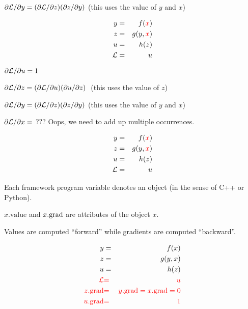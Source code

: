 {\medskip
{\color{red} ${\partial {\cal L}}/{\partial y} = ({\partial {\cal L}}/{\partial z}) ({\partial z}/{\partial y})$} (this uses the value of $y$ and $x$)

\vspace{-3ex}
\begin{eqnarray*}
  y & = & f({\color{red} x}) \\
  z & = & g(y,{\color{red} x}) \\
  u & = & h(z) \\
  {\cal L} &  = &  u
\end{eqnarray*}

\medskip
${\partial {\cal L}}/{\partial u} = 1$

\medskip
{\color{red} ${\partial {\cal L}}/{\partial z} = ({\partial {\cal L}}/{\partial u}) ({\partial u}/{\partial z})\;$} (this uses the value of $z$)

\medskip
{\color{red} ${\partial {\cal L}}/{\partial y} = ({\partial {\cal L}}/{\partial z}) ({\partial z}/{\partial y})$} (this uses the value of $y$ and $x$)

\medskip
{\color{red} ${\partial {\cal L}}/{\partial x} =$ ???} Oops, we need to add up multiple occurrences.

\vspace{-3ex}
\begin{eqnarray*}
  y & = & f({\color{red} x}) \\
  z & = & g(y,{\color{red} x}) \\
  u & = & h(z) \\
  {\cal L} &  = &  u
\end{eqnarray*}

\medskip
Each framework program variable denotes an {\color{red} object} (in the sense of C++ or Python).

\medskip
{\color{red} $x.\mathrm{value}$} and {\color{red} $x.\mathrm{grad}$} are attributes of the {\color{red} object $x$}.

\bigskip
Values are computed ``forward'' while gradients are computed ``backward''.


\vspace{-3ex}
\begin{eqnarray*}
  y & = & f(x) \\
  z & = & g(y,x) \\
  u & = & h(z) \\
  {\color{red} {\cal L}} &  {\color{red} =} & {\color{red}  u} \\
  {\color{red} z.\mathrm{grad}} & {\color{red} =} & {\color{red} y.\mathrm{grad} = x.\mathrm{grad} = 0} \\
  {\color{red} u.\mathrm{grad}} & {\color{red} =} & {\color{red} 1} \\
\end{eqnarray*}

}
